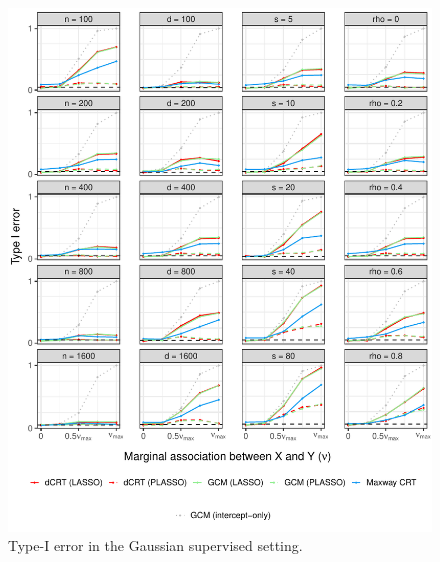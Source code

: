\documentclass[aos]{imsart}
\theoremstyle{definition}
\theoremstyle{remark}
\begin{document}
\begin{figure}[!ht]
	\centering
	\includegraphics[width = \textwidth]{figures/gaussian_supervised_setting_null.pdf}
	\caption{Type-I error in the Gaussian supervised setting.}
	\label{fig:gaussian_supervised_null}
\end{figure}
\end{document}

